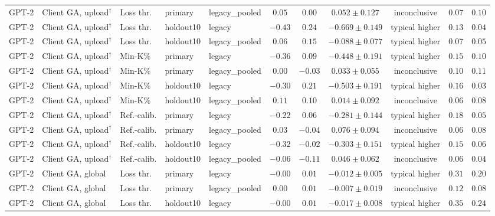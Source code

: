 {\begin{longtable}{@{\extracolsep{\fill}}lllllcccccc@{}}
GPT-2 & Client GA, upload$^{\dagger}$ & Loss thr. & primary & legacy\_pooled & $0.05$ & $0.00$ & $0.052 \pm 0.127$ & inconclusive & $0.07$ & $0.10$ \\
GPT-2 & Client GA, upload$^{\dagger}$ & Loss thr. & holdout10 & legacy & $-0.43$ & $0.24$ & $-0.669 \pm 0.149$ & typical higher & $0.13$ & $0.04$ \\
GPT-2 & Client GA, upload$^{\dagger}$ & Loss thr. & holdout10 & legacy\_pooled & $0.06$ & $0.15$ & $-0.088 \pm 0.077$ & typical higher & $0.07$ & $0.05$ \\
GPT-2 & Client GA, upload$^{\dagger}$ & Min-K\% & primary & legacy & $-0.36$ & $0.09$ & $-0.448 \pm 0.191$ & typical higher & $0.15$ & $0.10$ \\
GPT-2 & Client GA, upload$^{\dagger}$ & Min-K\% & primary & legacy\_pooled & $0.00$ & $-0.03$ & $0.033 \pm 0.055$ & inconclusive & $0.10$ & $0.11$ \\
GPT-2 & Client GA, upload$^{\dagger}$ & Min-K\% & holdout10 & legacy & $-0.30$ & $0.21$ & $-0.503 \pm 0.191$ & typical higher & $0.16$ & $0.03$ \\
GPT-2 & Client GA, upload$^{\dagger}$ & Min-K\% & holdout10 & legacy\_pooled & $0.11$ & $0.10$ & $0.014 \pm 0.092$ & inconclusive & $0.06$ & $0.08$ \\
GPT-2 & Client GA, upload$^{\dagger}$ & Ref.-calib. & primary & legacy & $-0.22$ & $0.06$ & $-0.281 \pm 0.144$ & typical higher & $0.18$ & $0.05$ \\
GPT-2 & Client GA, upload$^{\dagger}$ & Ref.-calib. & primary & legacy\_pooled & $0.03$ & $-0.04$ & $0.076 \pm 0.094$ & inconclusive & $0.06$ & $0.08$ \\
GPT-2 & Client GA, upload$^{\dagger}$ & Ref.-calib. & holdout10 & legacy & $-0.32$ & $-0.02$ & $-0.303 \pm 0.151$ & typical higher & $0.15$ & $0.06$ \\
GPT-2 & Client GA, upload$^{\dagger}$ & Ref.-calib. & holdout10 & legacy\_pooled & $-0.06$ & $-0.11$ & $0.046 \pm 0.062$ & inconclusive & $0.06$ & $0.04$ \\
GPT-2 & Client GA, global & Loss thr. & primary & legacy & $-0.00$ & $0.01$ & $-0.012 \pm 0.005$ & typical higher & $0.31$ & $0.20$ \\
GPT-2 & Client GA, global & Loss thr. & primary & legacy\_pooled & $0.00$ & $0.01$ & $-0.007 \pm 0.019$ & inconclusive & $0.12$ & $0.08$ \\
GPT-2 & Client GA, global & Loss thr. & holdout10 & legacy & $-0.00$ & $0.01$ & $-0.017 \pm 0.008$ & typical higher & $0.35$ & $0.24$ \\

\end{longtable}}
